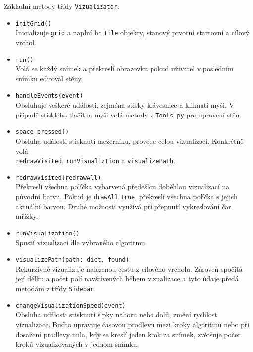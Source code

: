 \documentclass[12pt]{report}			%
\begin{document}
			Základní metody třídy \texttt{Vizualizator}:
			\begin{itemize}
			\setlength\itemsep{0.01mm}
			\item \texttt{initGrid()}\\
			Inicializuje \texttt{grid} a naplní ho \texttt{Tile} objekty, stanový prvotní startovní a cílový vrchol.
\item \texttt{run()}\\
Volá se každý snímek a překreslí obrazovku pokud uživatel v posledním snímku editoval stěny.
\item \texttt{handleEvents(event)}\\
Obsluhuje veškeré události, zejména stisky klávesnice a kliknutí myši. V případě stisklého tlačítka myši volá metody z \texttt{Tools.py} pro upravení stěn.

\item \texttt{space\_pressed()}\\
Obsluha události stisknutí mezerníku, provede celou vizualizaci. Konkrétně volá \\ \texttt{redrawVisited}, \texttt{runVisualiztion} a \texttt{visualizePath}.

\item \texttt{redrawVisited(redrawAll)}\\
Překreslí všechna políčka vybarvená předešlou doběhlou vizualizací na původní barvu. Pokud je \texttt{drawAll} \texttt{True}, překreslí všechna políčka s jejich aktuální barvou. Druhé možnosti využívá při přepnutí vykreslování čar mřížky.
\item \texttt{runVisualization()}\\
Spustí vizualizaci dle vybraného algoritmu.

\item \texttt{visualizePath(path: dict, found)}\\
Rekurzivně vizualizuje nalezenou cestu z cílového vrcholu. Zároveň spočítá její délku a počet polí navštívených během vizualizace a tyto údaje předá metodám z třídy \texttt{Sidebar}.


\item \texttt{changeVisualizationSpeed(event)}\\
Obsluha události stisknutí šipky nahoru nebo dolů, změní rychlost vizualizace. Buďto upravuje časovou prodlevu mezi kroky algoritmu nebo při dosažení prodlevy nula, kdy se kreslí jeden krok za snímek, zvětšuje počet kroků vizualizovaných v jednom snímku.

\end{itemize}
\end{document}
